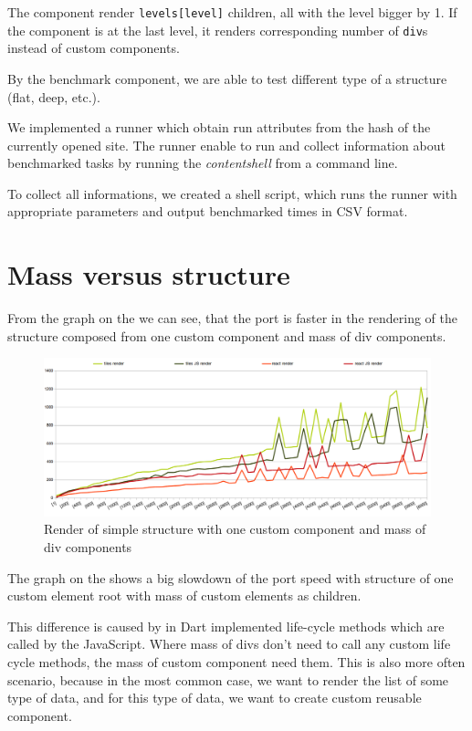 The component render \texttt{levels[level]} children, all with the level bigger by 1.
If the component is at the last level, it renders corresponding number of \texttt{div}s instead of custom components.

By the benchmark component, we are able to test different type of a structure (flat, deep, etc.).

We implemented a runner which obtain run attributes from the hash of the currently opened site. 
The runner enable to run and collect information about benchmarked tasks by running the \textit{content\textunderscore shell} from a command line.

To collect all informations, we created a shell script, which runs the runner with appropriate parameters and output benchmarked times in CSV format.

\section{Mass versus structure}\label{sec:benchmarks-mass-vs-structure}

	From the graph on the  we can see, that the \react port is faster 
	in the rendering of the structure composed from one custom component and mass of div components.
	\begin{figure}[h]
	\centering  
		\includegraphics[scale=0.5]{images/benchmarks/m_render.png}
		\caption{Render of simple structure with one custom component and mass of div components}
		\label{img:benchmarks-mass-render}
	\end{figure}

	The graph on the  shows a big slowdown of the \react port speed with structure 
	of one custom element root with mass of custom elements as children.

	This difference is caused by in Dart implemented life-cycle methods which are called by the JavaScript.
	Where mass of divs don't need to call any custom life cycle methods, the mass of custom component need them. 
	This is also more often scenario, because in the most common case, we want to render the list of some type of data, 
	and for this type of data, we want to create custom reusable component.

